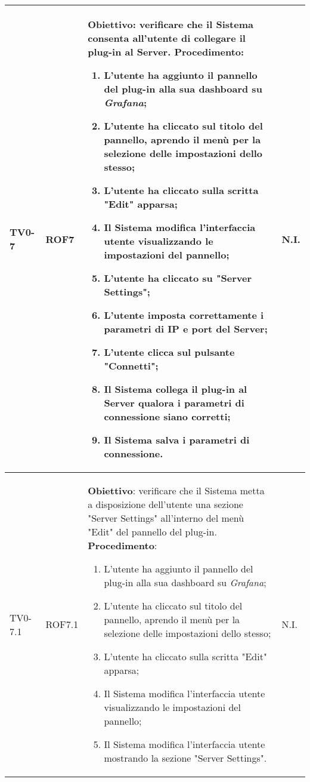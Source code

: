 \begin{longtable}{|C{.15\textwidth}|C{.13\textwidth}|m{.65\textwidth}|C{.08\textwidth}|}
TV0-7 & ROF7 &
	\textbf{Obiettivo}: verificare che il Sistema consenta all'utente di collegare il plug-in al Server. \newline
	\textbf{Procedimento}:
	\begin{enumerate}
		\item L'utente ha aggiunto il pannello del plug-in alla sua dashboard su \textit{Grafana};
		\item L'utente ha cliccato sul titolo del pannello, aprendo il menù per la selezione delle impostazioni dello stesso;
		\item L'utente ha cliccato sulla scritta "Edit" apparsa;
		\item Il Sistema modifica l'interfaccia utente visualizzando le impostazioni del pannello;
		\item L'utente ha cliccato su "Server Settings";
		\item L'utente imposta correttamente i parametri di IP e port del Server;
		\item L'utente clicca sul pulsante "Connetti";
		\item Il Sistema collega il plug-in al Server qualora i parametri di connessione siano corretti;
		\item Il Sistema salva i parametri di connessione.
	\end{enumerate}
	& N.I. \\
\hline

TV0-7.1 & ROF7.1 &
	\textbf{Obiettivo}: verificare che il Sistema metta a disposizione dell'utente una sezione "Server Settings" all'interno del menù "Edit" del pannello del plug-in. \newline
	\textbf{Procedimento}:
	\begin{enumerate}
		\item L'utente ha aggiunto il pannello del plug-in alla sua dashboard su \textit{Grafana};
		\item L'utente ha cliccato sul titolo del pannello, aprendo il menù per la selezione delle impostazioni dello stesso;
		\item L'utente ha cliccato sulla scritta "Edit" apparsa;
		\item Il Sistema modifica l'interfaccia utente visualizzando le impostazioni del pannello;
		\item Il Sistema modifica l'interfaccia utente mostrando la sezione "Server Settings".
	\end{enumerate}
	& N.I. \\
\hline


\end{longtable}
